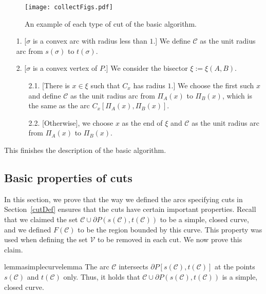 \documentclass{article}
\newcommand{\PP}{P}
\newcommand{\se}{\sigma}
\newcommand{\VV}{\mathcal V}
\newcommand{\cutreg}{F}
\newcommand{\cut}{\mathcal C}
\newcommand{\start}{s}
\newcommand{\terminal}{t}
\newcommand{\arcA}{A}
\newcommand{\arcB}{B}
\newcommand{\mydef}{:=}
\begin{document}
\begin{figure}
\centering
\texttt{[image: collectFigs.pdf]}
\caption{An example of each type of cut of the basic algorithm.}
\label{fig:cuttypesSimple}
\end{figure}

\begin{enumerate}
\item[1.]
[$\se$ is a convex arc with radius less than $1$.]
We define $\cut$ as the unit radius arc from $\start(\se)$ to $\terminal(\se)$.

\item[2.]
[$\se$ is a convex vertex of $\PP$.]
We consider the bisector $\xi\mydef \xi(\arcA,\arcB)$.
 
\begin{enumerate}
\item[2.1.]
[There is $x\in\xi$ such that $C_x$ has radius $1$.]
We choose the first such $x$ and define $\cut$ as the unit radius arc from $\Pi_{\arcA}(x)$ to $\Pi_{\arcB}(x)$, which is the same as the arc $C_x[\Pi_{\arcA}(x),\Pi_{\arcB}(x)]$.

\item[2.2.]
[Otherwise], we choose $x$ as the end of $\xi$ and $\cut$ as the unit radius arc from $\Pi_{\arcA}(x)$ to $\Pi_{\arcB}(x)$.
\end{enumerate}
\end{enumerate}

This finishes the description of the basic algorithm.

\subsection{Basic properties of cuts}\label{sec:basicSimple}

In this section, we prove that the way we defined the arcs specifying cuts in Section~\ref{cutDef} ensures that the cuts have certain important  properties.
Recall that we claimed the set $\cut\cup \partial\PP(\start(\cut),\terminal(\cut))$ to be a simple, closed curve, and we defined $\cutreg(\cut)$ to be the region bounded by this curve.
This property was used when defining the set $\VV$ to be removed in each cut.
We now prove this claim.

\begin{restatable}{lemma}{simplecurvelemma}
\label{lem:simplecurve}
The arc $\cut$ intersects $\partial\PP[\start(\cut),\terminal(\cut)]$ at the points $\start(\cut)$ and $\terminal(\cut)$ only.
Thus, it holds that $\cut\cup \partial\PP(\start(\cut),\terminal(\cut))$ is a simple, closed curve.
\end{restatable}
\end{document}

